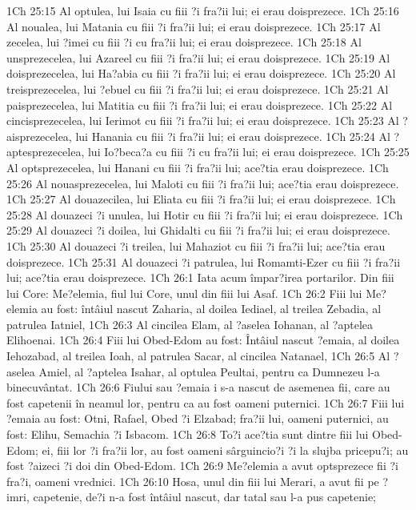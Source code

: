 1Ch 25:15  Al optulea, lui Isaia cu fiii ?i fra?ii lui; ei erau doisprezece.
1Ch 25:16  Al noualea, lui Matania cu fiii ?i fra?ii lui; ei erau doisprezece.
1Ch 25:17  Al zecelea, lui ?imei cu fiii ?i cu fra?ii lui; ei erau doisprezece.
1Ch 25:18  Al unsprezecelea, lui Azareel cu fiii ?i fra?ii lui; ei erau doisprezece.
1Ch 25:19  Al doisprezecelea, lui Ha?abia cu fiii ?i fra?ii lui; ei erau doisprezece.
1Ch 25:20  Al treisprezecelea, lui ?ebuel cu fiii ?i fra?ii lui; ei erau doisprezece.
1Ch 25:21  Al paisprezecelea, lui Matitia cu fiii ?i fra?ii lui; ei erau doisprezece.
1Ch 25:22  Al cincisprezecelea, lui Ierimot cu fiii ?i fra?ii lui; ei erau doisprezece.
1Ch 25:23  Al ?aisprezecelea, lui Hanania cu fiii ?i fra?ii lui; ei erau doisprezece.
1Ch 25:24  Al ?aptesprezecelea, lui Io?beca?a cu fiii ?i cu fra?ii lui; ei erau doisprezece.
1Ch 25:25  Al optsprezecelea, lui Hanani cu fiii ?i fra?ii lui; ace?tia erau doisprezece.
1Ch 25:26  Al nouasprezecelea, lui Maloti cu fiii ?i fra?ii lui; ace?tia erau doisprezece.
1Ch 25:27  Al douazecilea, lui Eliata cu fiii ?i fra?ii lui; ei erau doisprezece.
1Ch 25:28  Al douazeci ?i unulea, lui Hotir cu fiii ?i fra?ii lui; ei erau doisprezece.
1Ch 25:29  Al douazeci ?i doilea, lui Ghidalti cu fiii ?i fra?ii lui; ei erau doisprezece.
1Ch 25:30  Al douazeci ?i treilea, lui Mahaziot cu fiii ?i fra?ii lui; ace?tia erau doisprezece.
1Ch 25:31  Al douazeci ?i patrulea, lui Romamti-Ezer cu fiii ?i fra?ii lui; ace?tia erau doisprezece.
1Ch 26:1  Iata acum împar?irea portarilor. Din fiii lui Core: Me?elemia, fiul lui Core, unul din fiii lui Asaf.
1Ch 26:2  Fiii lui Me?elemia au fost: întâiul nascut Zaharia, al doilea Iediael, al treilea Zebadia, al patrulea Iatniel,
1Ch 26:3  Al cincilea Elam, al ?aselea Iohanan, al ?aptelea Elihoenai.
1Ch 26:4  Fiii lui Obed-Edom au fost: Întâiul nascut ?emaia, al doilea Iehozabad, al treilea Ioah, al patrulea Sacar, al cincilea Natanael,
1Ch 26:5  Al ?aselea Amiel, al ?aptelea Isahar, al optulea Peultai, pentru ca Dumnezeu l-a binecuvântat.
1Ch 26:6  Fiului sau ?emaia i s-a nascut de asemenea fii, care au fost capetenii în neamul lor, pentru ca au fost oameni puternici.
1Ch 26:7  Fiii lui ?emaia au fost: Otni, Rafael, Obed ?i Elzabad; fra?ii lui, oameni puternici, au fost: Elihu, Semachia ?i Isbacom.
1Ch 26:8  To?i ace?tia sunt dintre fiii lui Obed-Edom; ei, fiii lor ?i fra?ii lor, au fost oameni sârguincio?i ?i la slujba pricepu?i; au fost ?aizeci ?i doi din Obed-Edom.
1Ch 26:9  Me?elemia a avut optsprezece fii ?i fra?i, oameni vrednici.
1Ch 26:10  Hosa, unul din fiii lui Merari, a avut fii pe ?imri, capetenie, de?i n-a fost întâiul nascut, dar tatal sau l-a pus capetenie;
